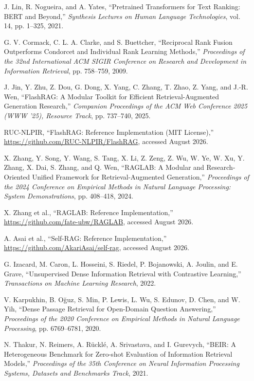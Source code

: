 J. Lin, R. Nogueira, and A. Yates,
``Pretrained Transformers for Text Ranking: BERT and Beyond,''
\textit{Synthesis Lectures on Human Language Technologies},
vol. 14, pp. 1--325, 2021.

G. V. Cormack, C. L. A. Clarke, and S. Buettcher,
``Reciprocal Rank Fusion Outperforms Condorcet and Individual Rank Learning
Methods,''
\textit{Proceedings of the 32nd International ACM SIGIR Conference on Research
and Development in Information Retrieval},
pp. 758--759, 2009.

J. Jin, Y. Zhu, Z. Dou, G. Dong, X. Yang, C. Zhang, T. Zhao, Z. Yang, and
J.-R. Wen,
``FlashRAG: A Modular Toolkit for Efficient Retrieval-Augmented Generation
Research,''
\textit{Companion Proceedings of the ACM Web Conference 2025 (WWW '25),
Resource Track},
pp. 737--740, 2025.

RUC-NLPIR,
``FlashRAG: Reference Implementation (MIT License),''
\url{https://github.com/RUC-NLPIR/FlashRAG}, accessed August 2026.

X. Zhang, Y. Song, Y. Wang, S. Tang, X. Li, Z. Zeng, Z. Wu, W. Ye, W. Xu,
Y. Zhang, X. Dai, S. Zhang, and Q. Wen,
``RAGLAB: A Modular and Research-Oriented Unified Framework for
Retrieval-Augmented Generation,''
\textit{Proceedings of the 2024 Conference on Empirical Methods in Natural
Language Processing: System Demonstrations},
pp. 408--418, 2024.

X. Zhang et al.,
``RAGLAB: Reference Implementation,''
\url{https://github.com/fate-ubw/RAGLAB}, accessed August 2026.

A. Asai et al.,
``Self-RAG: Reference Implementation,''
\url{https://github.com/AkariAsai/self-rag}, accessed August 2026.

G. Izacard, M. Caron, L. Hosseini, S. Riedel, P. Bojanowski, A. Joulin, and
E. Grave,
``Unsupervised Dense Information Retrieval with Contrastive Learning,''
\textit{Transactions on Machine Learning Research}, 2022.

V. Karpukhin, B. O\u{g}uz, S. Min, P. Lewis, L. Wu, S. Edunov, D. Chen, and
W. Yih,
``Dense Passage Retrieval for Open-Domain Question Answering,''
\textit{Proceedings of the 2020 Conference on Empirical Methods in Natural
Language Processing},
pp. 6769--6781, 2020.

N. Thakur, N. Reimers, A. R\"uckl\'e, A. Srivastava, and I. Gurevych,
``BEIR: A Heterogeneous Benchmark for Zero-shot Evaluation of Information
Retrieval Models,''
\textit{Proceedings of the 35th Conference on Neural Information Processing
Systems, Datasets and Benchmarks Track}, 2021.

